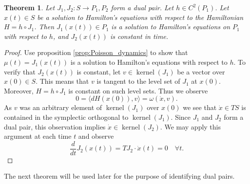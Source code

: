 \documentclass[12pt]{amsart}
\newtheorem{thm}{Theorem}[section]
\DeclareMathOperator{\kernel}{kernel}
\begin{document}
  \begin{thm} \label{thm:dual_pairs}
    Let $J_1,J_2:S \to P_1,P_2$ form a dual pair.
    Let $h \in C^2(P_1)$.
    Let $x(t) \in S$ be a solution to Hamilton's equations
    with respect to the Hamiltonian $H = h \circ J_1$.
    Then $J_1\left( x(t) \right) \in P_1$ is a solution
    to Hamilton's equations on $P_1$ with respect to $h$,
    and $J_2( x(t))$ is constant in time.
  \end{thm}
  \begin{proof}
    Use proposition \ref{prop:Poisson_dynamics} to show that
    $\mu(t) = J_1 (x(t))$ is a solution to Hamilton's equations
    with respect to $h$.
    To verify that $J_2( x(t) )$ is constant,
    let $v \in \kernel(J_1)$ be a vector over $x(0) \in S$.
    This means that $v$ is tangent to the level set of $J_1$ at $x(0)$.
    Moreover, $H = h \circ J_1$ is constant on such level sets.
    Thus we observe
    \begin{equation*}
      0 = \langle dH(x(0)) , v \rangle =
      \omega \left( \dot{x} , v \right).
    \end{equation*}
    As $v$ was an arbitrary element of $\kernel(J_1)$ over $x(0)$
    we see that $\dot{x} \in TS$ is contained
    in the symplectic orthogonal to $\kernel(J_1)$.
    Since $J_1$ and $J_2$ form a dual pair,
    this observation implies $\dot{x} \in \kernel(J_2)$.
    We may apply this argument at each time $t$ and observe
    \begin{equation*}
      \frac{d}{dt} J_2( x(t)) = TJ_2 \cdot \dot{x}(t)  
      = 0 \quad \forall t.
    \end{equation*}
  \end{proof}
  
  The next theorem will be used later for the purpose of identifying
  dual pairs.
  
\end{document}

